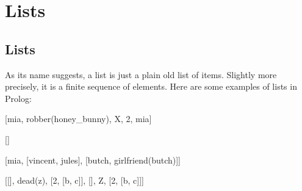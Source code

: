 

\chapter{Lists}\label{CHAPTER4}


\section{Lists}\label{SEC.L4.LISTS}



As its name suggests, a list is just a plain old list of
items. Slightly more precisely, it is a finite sequence of elements.
Here are some examples of lists in Prolog:


\begin{LPNcodedisplay}

[mia, robber(honey_bunny), X, 2, mia]

[]

[mia, [vincent, jules], [butch, girlfriend(butch)]]

[[], dead(z), [2, [b, c]], [], Z, [2, [b, c]]]
\end{LPNcodedisplay}



